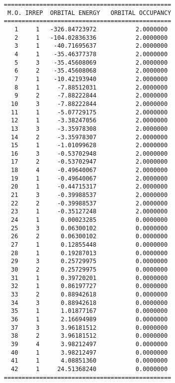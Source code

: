 \documentclass[11pt,fleqn]{article}
\begin{document}
{
\footnotesize
\begin{verbatim}
           ===============================================
            M.O. IRREP  ORBITAL ENERGY   ORBITAL OCCUPANCY
           ===============================================
              1     1   -326.84723972           2.0000000
              2     1   -104.02836336           2.0000000
              3     1    -40.71695637           2.0000000
              4     1    -35.46377378           2.0000000
              5     3    -35.45608069           2.0000000
              6     2    -35.45608068           2.0000000
              7     1    -10.42193940           2.0000000
              8     1     -7.88512031           2.0000000
              9     2     -7.88222844           2.0000000
             10     3     -7.88222844           2.0000000
             11     1     -5.07729175           2.0000000
             12     1     -3.38247056           2.0000000
             13     3     -3.35978308           2.0000000
             14     2     -3.35978307           2.0000000
             15     1     -1.01099628           2.0000000
             16     3     -0.53702948           2.0000000
             17     2     -0.53702947           2.0000000
             18     4     -0.49640067           2.0000000
             19     1     -0.49640067           2.0000000
             20     1     -0.44715317           2.0000000
             21     3     -0.39988537           2.0000000
             22     2     -0.39988537           2.0000000
             23     1     -0.35127248           2.0000000
             24     1      0.00023285           0.0000000
             25     3      0.06300102           0.0000000
             26     2      0.06300102           0.0000000
             27     1      0.12855448           0.0000000
             28     1      0.19287013           0.0000000
             29     3      0.25729975           0.0000000
             30     2      0.25729975           0.0000000
             31     1      0.39720201           0.0000000
             32     1      0.86197727           0.0000000
             33     2      0.88942618           0.0000000
             34     3      0.88942618           0.0000000
             35     1      1.01877167           0.0000000
             36     1      2.16694989           0.0000000
             37     3      3.96181512           0.0000000
             38     2      3.96181512           0.0000000
             39     4      3.98212497           0.0000000
             40     1      3.98212497           0.0000000
             41     1      4.08851360           0.0000000
             42     1     24.51368240           0.0000000
           ===============================================
\end{verbatim}
}
\end{document}
